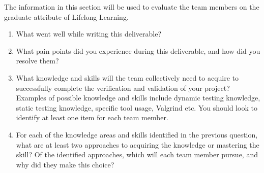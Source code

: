 \documentclass[12pt, titlepage]{article}
\begin{document}
The information in this section will be used to evaluate the team members on the
graduate attribute of Lifelong Learning.


\begin{enumerate}
  \item What went well while writing this deliverable? 
  \item What pain points did you experience during this deliverable, and how
    did you resolve them?
  \item What knowledge and skills will the team collectively need to acquire to
  successfully complete the verification and validation of your project?
  Examples of possible knowledge and skills include dynamic testing knowledge,
  static testing knowledge, specific tool usage, Valgrind etc.  You should look to
  identify at least one item for each team member.
  \item For each of the knowledge areas and skills identified in the previous
  question, what are at least two approaches to acquiring the knowledge or
  mastering the skill?  Of the identified approaches, which will each team
  member pursue, and why did they make this choice?
\end{enumerate}
\end{document}
